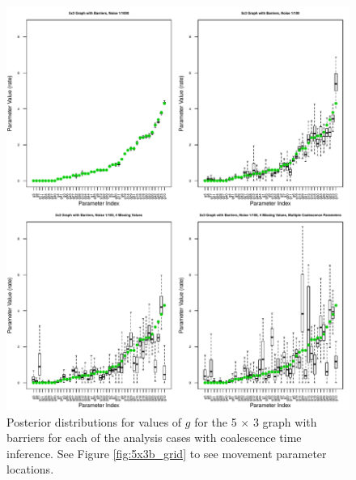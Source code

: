 \documentclass{article}
\begin{document}
\begin{figure}
\centering
     \includegraphics[scale=0.8]{figs/5x3boxplots}
    \caption{Posterior distributions for values of $g$ 
    for the 5 $\times$ 3 graph with barriers 
    for each of the analysis cases with coalescence time inference.
    See Figure \ref{fig:5x3b_grid} to see movement parameter locations.
}
    \label{fig:5x3boxplots_mult_gam}
\end{figure}
\end{document}
